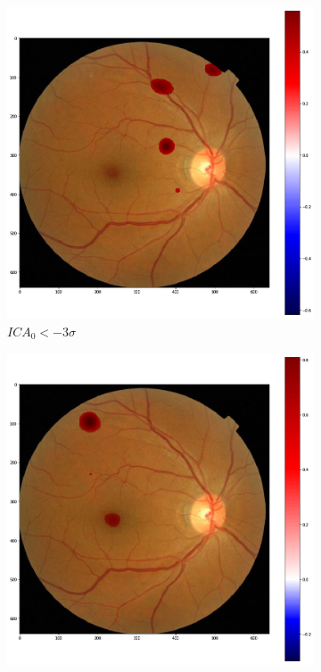 \documentclass[review]{elsarticle}
\theoremstyle{definition} %
\theoremstyle{remark}
\begin{document}
\begin{figure}[h!]
	\centering
	\begin{subfigure}[b]{0.32\textwidth}
		\centering
		\includegraphics[width=\textwidth]{./figures/ica_retine_maps/G1-P2/m00.png}
		\caption{$ICA_0 < - 3 \sigma$}	
	\end{subfigure}
	\begin{subfigure}[b]{0.32\textwidth}
		\centering
		\includegraphics[width=\textwidth]{./figures/ica_retine_maps/G1-P2/m01.png}

\end{subfigure}
\end{figure}
\end{document}
